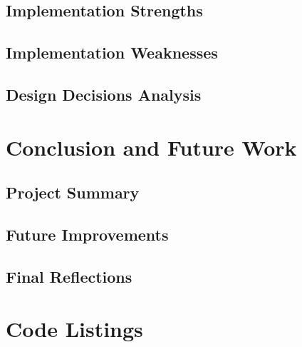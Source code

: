 \documentclass[12pt,a4paper]{report}
\begin{document}
\section{Implementation Strengths}

\section{Implementation Weaknesses}

\section{Design Decisions Analysis}

\chapter{Conclusion and Future Work}
\section{Project Summary}

\section{Future Improvements}

\section{Final Reflections}

\appendix
\chapter{Code Listings}
\end{document}
